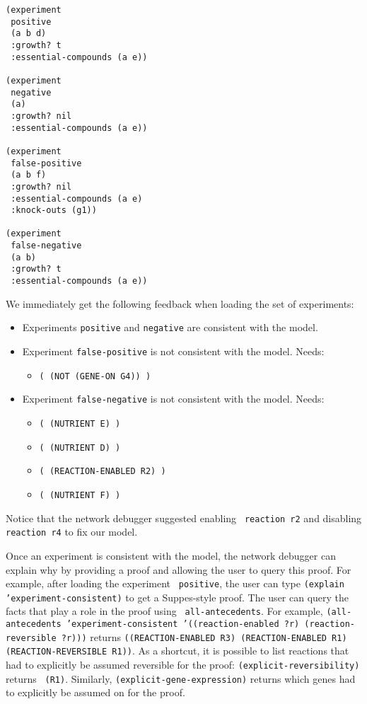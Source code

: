 \begin{lstlisting}[label={listing:experiments},caption={Experiments}]
(experiment 
 positive 
 (a b d) 
 :growth? t 
 :essential-compounds (a e))

(experiment 
 negative 
 (a) 
 :growth? nil 
 :essential-compounds (a e))

(experiment 
 false-positive 
 (a b f) 
 :growth? nil 
 :essential-compounds (a e) 
 :knock-outs (g1))

(experiment
 false-negative
 (a b)
 :growth? t
 :essential-compounds (a e))
\end{lstlisting}

We immediately get the following feedback when loading the set of
experiments:
\begin{itemize}
\item Experiments {\small\tt positive} and {\small\tt negative} are consistent with the model.
\item Experiment {\small\tt false-positive} is not consistent with the model. Needs:
\begin{itemize}
\item {\small\tt ( (NOT (GENE-ON G4)) )}
\end{itemize}
\item Experiment {\small\tt false-negative} is not consistent with the model. Needs:
\begin{itemize}
\item {\small\tt ( (NUTRIENT E) )}
\item {\small\tt ( (NUTRIENT D) )}
\item {\small\tt ( (REACTION-ENABLED R2) )}
\item {\small\tt ( (NUTRIENT F) )}
\end{itemize}
\end{itemize}

Notice that the network debugger suggested enabling {\small\tt
reaction r2} and disabling {\small\tt reaction r4} to fix our model.

Once an experiment is consistent with the model, the network debugger
can explain why by providing a proof and allowing the user to query
this proof. For example, after loading the experiment {\small\tt
positive}, the user can type {\small\tt (explain
'experiment-consistent)} to get a Suppes-style proof. The user can
query the facts that play a role in the proof using {\small\tt
all-antecedents}. For example, {\small\tt (all-antecedents
'experiment-consistent '((reaction-enabled ?r) (reaction-reversible
?r)))} returns {\small\tt ((REACTION-ENABLED R3) (REACTION-ENABLED R1)
(REACTION-REVERSIBLE R1))}. As a shortcut, it is possible to list
reactions that had to explicitly be assumed reversible for the proof:
{\small\tt (explicit-reversibility)} returns {\small\tt
(R1)}. Similarly, {\small\tt (explicit-gene-expression)} returns which
genes had to explicitly be assumed on for the proof.

